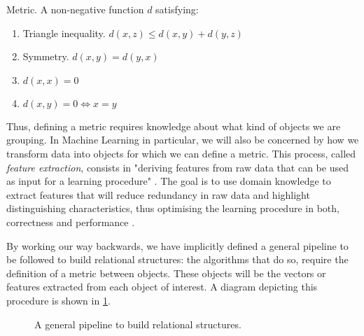 \documentclass[../main.tex]{subfiles} \label{chapter_soa}
\begin{document}
\theoremstyle{definition}
\begin{definition}{Metric}.
\label{def_metric}
A non-negative function $d$ satisfying:
\begin{enumerate}
\item Triangle inequality. $d(x, z) \leq d(x, y) + d(y, z) $
\item Symmetry. $d(x, y) = d(y, x)$
\item $d(x, x) = 0$
\item $d(x, y) = 0 \iff x = y$
\end{enumerate}
\end{definition}
\par Thus, defining a metric requires knowledge about what kind of objects we are grouping. In Machine Learning in particular, we will also be concerned by how we transform data into objects for which we can define a metric. This process, called \emph{feature extraction}, consists in "deriving features from raw data that can be used as input for a learning procedure" \cite{hastie2008}. The goal is to use domain knowledge to extract features that will reduce redundancy in raw data and highlight distinguishing characteristics, thus optimising the learning procedure in both, correctness and performance \cite{Bishop2006}. 
\par By working our way backwards, we have implicitly defined a general pipeline to be followed to build relational structures: the algorithms that do so, require the definition of a metric between objects. These objects will be the vectors or features extracted from each object of interest. A diagram depicting this procedure is shown in \ref{pipeline}.
\begin{figure}
\centering
{}
\caption{A general pipeline to build relational structures.}
\label{pipeline}
\end{figure}
\end{document}
